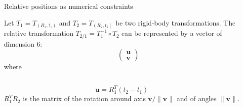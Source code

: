 %
%

\begin {frame} {Relative positions as numerical constraints}

Let $T_1 = T_{(R_1,t_1)}$ and $T_2 = T_{(R_2,t_2)}$ be two rigid-body transformations. The relative transformation $T_{2/1} = T_1^{-1}\circ T_2$ can be represented by a vector of dimension 6:
$$
\left(\begin{array}{c} \mathbf{u} \\ \mathbf {v}\end{array}\right)
$$
where
\begin {columns}
$$
\mathbf{u} = R_1^T (t_2-t_1)
$$
$R_1^T R_2$ is the matrix of the rotation around axis $\mathbf{v}/\|\mathbf {v}\|$ and of angles $\|\mathbf {v}\|$.
\end {columns}
\end {frame}

